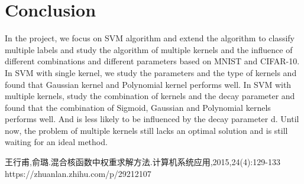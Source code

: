 \documentclass[twocolumn, a4paper]{article}
\begin{document}
\section{Conclusion}
In the project, we focus on SVM algorithm and extend the algorithm to classify multiple labels and study the algorithm of multiple kernels and the influence of different combinations and different parameters based on MNIST and CIFAR-10. In SVM with single kernel, we study the parameters and the type of kernels and found that Gaussian kernel and Polynomial kernel performs well. In SVM with multiple kernels, study the combination of kernels and the decay parameter and found that the combination of Sigmoid, Gaussian and Polynomial kernels performs well. And is less likely to be influenced by the decay parameter d. Until now, the problem of multiple kernels still lacks an optimal solution and is still waiting for an ideal method.

\begin{thebibliography}{99}  

王行甫,俞璐.混合核函数中权重求解方法.计算机系统应用,2015,24(4):129-133
https://zhuanlan.zhihu.com/p/29212107
\end{thebibliography}
\end{document}
